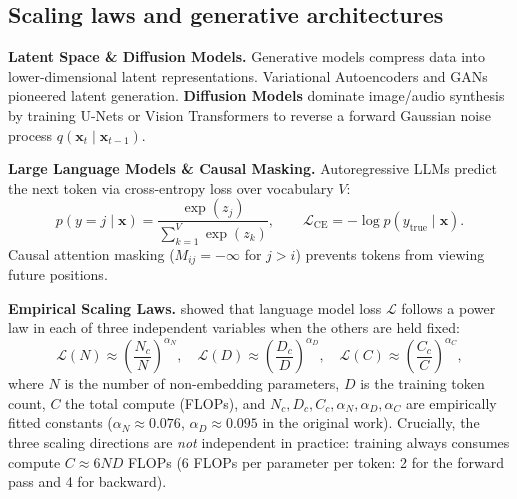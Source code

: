 \documentclass[11pt,a4paper]{article}
\begin{document}
	\subsection{Scaling laws and generative architectures}

	\textbf{Latent Space \& Diffusion Models.} Generative models compress data into lower-dimensional latent representations. Variational Autoencoders \parencite{kingma2014} and GANs \parencite{goodfellow2014} pioneered latent generation. \textbf{Diffusion Models} \parencite{ho2020} dominate image/audio synthesis by training U-Nets or Vision Transformers to reverse a forward Gaussian noise process $q(\mathbf{x}_t \mid \mathbf{x}_{t-1})$.
	
	\textbf{Large Language Models \& Causal Masking.} Autoregressive LLMs predict the next token via cross-entropy loss over vocabulary $V$:
	\begin{equation}
		p(y = j \mid \mathbf{x}) = \frac{\exp(z_j)}{\sum_{k=1}^{V} \exp(z_k)}, \qquad \mathcal{L}_{\text{CE}} = -\log p(y_{\text{true}} \mid \mathbf{x}).
	\end{equation}
	Causal attention masking ($M_{ij} = -\infty$ for $j > i$) prevents tokens from viewing future positions.
	
	\textbf{Empirical Scaling Laws.} \textcite{kaplan2020} showed that language model loss $\mathcal{L}$ follows a power law in each of three independent variables when the others are held fixed:
	\begin{equation}\label{eq:scaling_laws}
		\mathcal{L}(N) \approx \left(\frac{N_c}{N}\right)^{\!\alpha_N},\quad
		\mathcal{L}(D) \approx \left(\frac{D_c}{D}\right)^{\!\alpha_D},\quad
		\mathcal{L}(C) \approx \left(\frac{C_c}{C}\right)^{\!\alpha_C},
	\end{equation}
	where $N$ is the number of non-embedding parameters, $D$ is the training token count, $C$ the total compute (FLOPs), and $N_c, D_c, C_c, \alpha_N, \alpha_D, \alpha_C$ are empirically fitted constants ($\alpha_N \approx 0.076$, $\alpha_D \approx 0.095$ in the original work). Crucially, the three scaling directions are \emph{not} independent in practice: training always consumes compute $C \approx 6ND$ FLOPs (6 FLOPs per parameter per token: 2 for the forward pass and 4 for backward).
\end{document}
